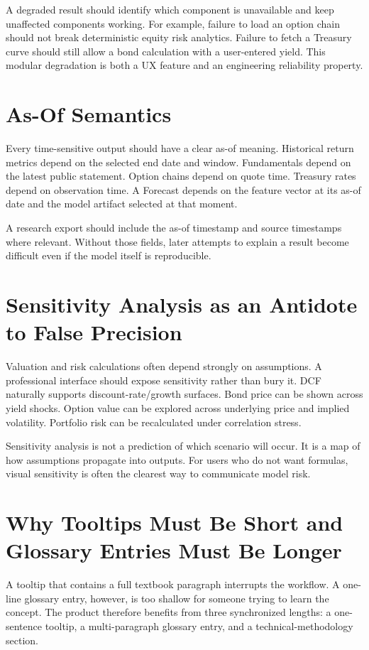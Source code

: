 \documentclass[11pt]{article}
\begin{document}
A degraded result should identify which component is unavailable and keep unaffected components working. For example, failure to load an option chain should not break deterministic equity risk analytics. Failure to fetch a Treasury curve should still allow a bond calculation with a user-entered yield. This modular degradation is both a UX feature and an engineering reliability property.

\section{As-Of Semantics}
Every time-sensitive output should have a clear as-of meaning. Historical return metrics depend on the selected end date and window. Fundamentals depend on the latest public statement. Option chains depend on quote time. Treasury rates depend on observation time. A Forecast depends on the feature vector at its as-of date and the model artifact selected at that moment.

A research export should include the as-of timestamp and source timestamps where relevant. Without those fields, later attempts to explain a result become difficult even if the model itself is reproducible.

\section{Sensitivity Analysis as an Antidote to False Precision}
Valuation and risk calculations often depend strongly on assumptions. A professional interface should expose sensitivity rather than bury it. DCF naturally supports discount-rate/growth surfaces. Bond price can be shown across yield shocks. Option value can be explored across underlying price and implied volatility. Portfolio risk can be recalculated under correlation stress.

Sensitivity analysis is not a prediction of which scenario will occur. It is a map of how assumptions propagate into outputs. For users who do not want formulas, visual sensitivity is often the clearest way to communicate model risk.

\section{Why Tooltips Must Be Short and Glossary Entries Must Be Longer}
A tooltip that contains a full textbook paragraph interrupts the workflow. A one-line glossary entry, however, is too shallow for someone trying to learn the concept. The product therefore benefits from three synchronized lengths: a one-sentence tooltip, a multi-paragraph glossary entry, and a technical-methodology section.
\end{document}
